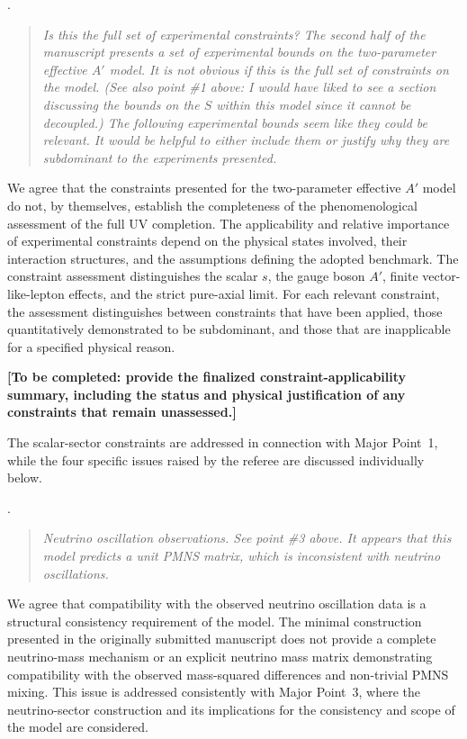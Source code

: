 \documentclass[12pt,a4paper]{article}
\begin{document}
\medskip
{}.
\begin{quote}\itshape
Is this the full set of experimental constraints? The second half of the manuscript presents a set of experimental bounds on the two-parameter effective \(A'\) model. It is not obvious if this is the full set of constraints on the model. (See also point \#1 above: I would have liked to see a section discussing the bounds on the \(S\) within this model since it cannot be decoupled.) The following experimental bounds seem like they could be relevant. It would be helpful to either include them or justify why they are subdominant to the experiments presented.
\end{quote}


We agree that the constraints presented for the two-parameter effective \(A'\) model do not, by themselves, establish the completeness of the phenomenological assessment of the full UV completion. The applicability and relative importance of experimental constraints depend on the physical states involved, their interaction structures, and the assumptions defining the adopted benchmark. The constraint assessment distinguishes the scalar \(s\), the gauge boson \(A'\), finite vector-like-lepton effects, and the strict pure-axial limit. For each relevant constraint, the assessment distinguishes between constraints that have been applied, those quantitatively demonstrated to be subdominant, and those that are inapplicable for a specified physical reason.

\textbf{[To be completed: provide the finalized constraint-applicability summary, including the status and physical justification of any constraints that remain unassessed.]}

The scalar-sector constraints are addressed in connection with Major Point~1, while the four specific issues raised by the referee are discussed individually below.

\medskip
{}.
\begin{quote}\itshape
Neutrino oscillation observations. See point \#3 above. It appears that this model predicts a unit PMNS matrix, which is inconsistent with neutrino oscillations.
\end{quote}


We agree that compatibility with the observed neutrino oscillation data is a structural consistency requirement of the model. The minimal construction presented in the originally submitted manuscript does not provide a complete neutrino-mass mechanism or an explicit neutrino mass matrix demonstrating compatibility with the observed mass-squared differences and non-trivial PMNS mixing. This issue is addressed consistently with Major Point~3, where the neutrino-sector construction and its implications for the consistency and scope of the model are considered.
\end{document}
